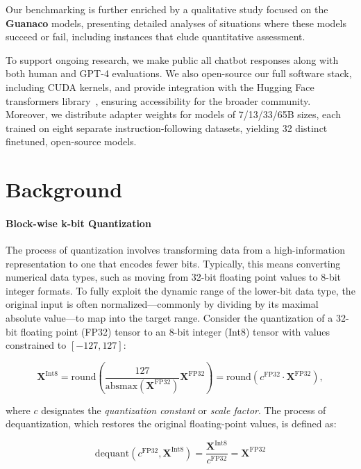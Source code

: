 Our benchmarking is further enriched by a qualitative study focused on the \textbf{Guanaco} models, presenting detailed analyses of situations where these models succeed or fail, including instances that elude quantitative assessment.

To support ongoing research, we make public all chatbot responses along with both human and GPT-4 evaluations. We also open-source our full software stack, including CUDA kernels, and provide integration with the Hugging Face transformers library~\citep{wolf2019huggingface}, ensuring accessibility for the broader community. Moreover, we distribute adapter weights for models of 7/13/33/65B sizes, each trained on eight separate instruction-following datasets, yielding 32 distinct finetuned, open-source models.

\section{Background}
\paragraph{Block-wise k-bit Quantization} The process of quantization involves transforming data from a high-information representation to one that encodes fewer bits. Typically, this means converting numerical data types, such as moving from 32-bit floating point values to 8-bit integer formats. To fully exploit the dynamic range of the lower-bit data type, the original input is often normalized—commonly by dividing by its maximal absolute value—to map into the target range. Consider the quantization of a 32-bit floating point (FP32) tensor to an 8-bit integer (Int8) tensor with values constrained to $[-127, 127]$:

\begin{equation}
    \mathbf{X}^{ \text{Int8}} = \text{round}\left( \frac{127}{{\text{absmax}}(\mathbf{X}^{{\text{FP32}}})}\mathbf{X}^{{\text{FP32}}} \right) = \text{round}(c^{\text{FP32}}\cdot \mathbf{X}^{{\text{FP32}}}),
\end{equation}

where $c$ designates the {\em quantization constant} or {\em scale factor}. The process of dequantization, which restores the original floating-point values, is defined as:

\begin{equation}
    \text{dequant}(c^{\text{FP32}}, \mathbf{X}^{\text{Int8}}) = \frac{\mathbf{X}^{\text{Int8}}}{c^{\text{FP32}}} = \mathbf{X}^{\text{FP32}}
\end{equation}

